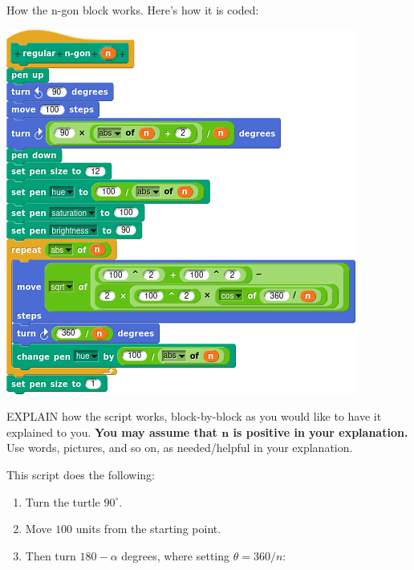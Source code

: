 \documentclass[noauthor,nooutcomes,12pt]{ximera}
\begin{document}
\begin{question}
  How the n-gon block works.  Here's how it is coded:
  \begin{center}
    \includegraphics{regNGonBlockScript.png}
  \end{center}
  EXPLAIN how the script works, block-by-block as you would like to
  have it explained to you. \textbf{You may assume that $\boldsymbol n$ is positive in
  your explanation.} Use words, pictures, and so on, as needed/helpful
  in your explanation.
  \begin{freeResponse}
    This script does the following:
    \begin{enumerate}
    \item Turn the turtle $90^\circ$.
    \item Move $100$ units from the starting point.
    \item Then turn $180-\alpha$ degrees, where setting $\theta=
      360/n$:
      \begin{center}
\end{center}
\end{enumerate}
\end{freeResponse}
\end{question}
\end{document}
